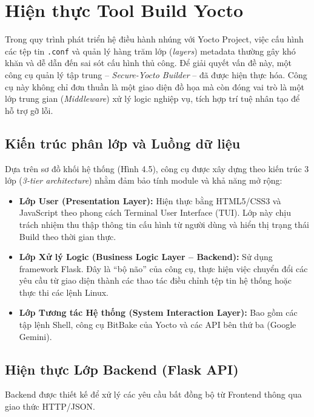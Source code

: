 \section{Hiện thực Tool Build Yocto}

Trong quy trình phát triển hệ điều hành nhúng với Yocto Project, việc cấu hình các tệp tin \texttt{.conf} và quản lý hàng trăm lớp (\textit{layers}) metadata thường gây khó khăn và dễ dẫn đến sai sót cấu hình thủ công. Để giải quyết vấn đề này, một công cụ quản lý tập trung -- \textit{Secure-Yocto Builder} -- đã được hiện thực hóa. Công cụ này không chỉ đơn thuần là một giao diện đồ họa mà còn đóng vai trò là một lớp trung gian (\textit{Middleware}) xử lý logic nghiệp vụ, tích hợp trí tuệ nhân tạo để hỗ trợ gỡ lỗi.

\subsection{Kiến trúc phân lớp và Luồng dữ liệu}

Dựa trên sơ đồ khối hệ thống (Hình 4.5), công cụ được xây dựng theo kiến trúc 3 lớp (\textit{3-tier architecture}) nhằm đảm bảo tính module và khả năng mở rộng:

\begin{itemize}
    \item \textbf{Lớp User (Presentation Layer):} Hiện thực bằng HTML5/CSS3 và JavaScript theo phong cách Terminal User Interface (TUI). Lớp này chịu trách nhiệm thu thập thông tin cấu hình từ người dùng và hiển thị trạng thái Build theo thời gian thực.

    \item \textbf{Lớp Xử lý Logic (Business Logic Layer -- Backend):} Sử dụng framework Flask. Đây là ``bộ não'' của công cụ, thực hiện việc chuyển đổi các yêu cầu từ giao diện thành các thao tác điều chỉnh tệp tin hệ thống hoặc thực thi các lệnh Linux.

    \item \textbf{Lớp Tương tác Hệ thống (System Interaction Layer):} Bao gồm các tập lệnh Shell, công cụ BitBake của Yocto và các API bên thứ ba (Google Gemini).
\end{itemize}
\subsection{Hiện thực Lớp Backend (Flask API)}

Backend được thiết kế để xử lý các yêu cầu bất đồng bộ từ Frontend thông qua giao thức HTTP/JSON.

